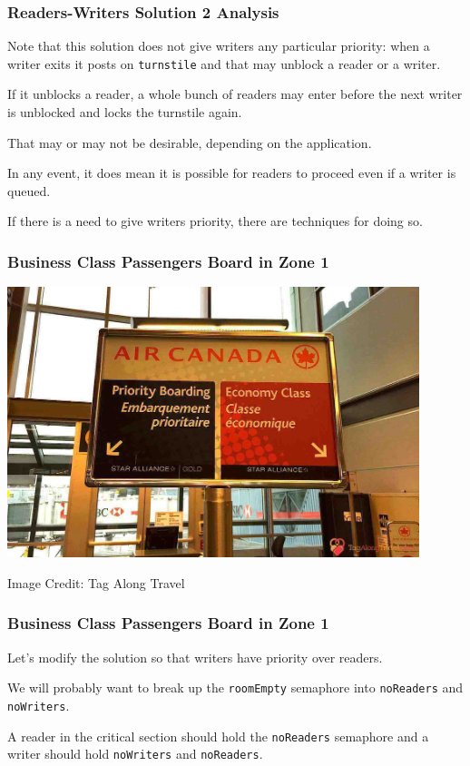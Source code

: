 \begin{frame}
	\frametitle{Readers-Writers Solution 2 Analysis}

	Note that this solution does not give writers any particular priority: when a writer exits it posts on \texttt{turnstile} and that may unblock a reader or a writer.

	If it unblocks a reader, a whole bunch of readers may enter before the next writer is unblocked and locks the turnstile again.

	That may or may not be desirable, depending on the application.

	In any event, it does mean it is possible for readers to proceed even if a writer is queued.

	If there is a need to give writers priority, there are techniques for doing so.
\end{frame}


\begin{frame}
	\frametitle{Business Class Passengers Board in Zone 1}

	\begin{center}
		\includegraphics[width=0.9\textwidth]{images/priority-boarding.jpg}
	\end{center}
	\hfill Image Credit: Tag Along Travel
\end{frame}


\begin{frame}
	\frametitle{Business Class Passengers Board in Zone 1}

	Let's modify the solution so that writers have priority over readers.

	We will probably want to break up the \texttt{roomEmpty} semaphore into \texttt{noReaders} and \texttt{noWriters}.

	A reader in the critical section should hold the \texttt{noReaders} semaphore and a writer should hold \texttt{noWriters} and \texttt{noReaders}.

\end{frame}


